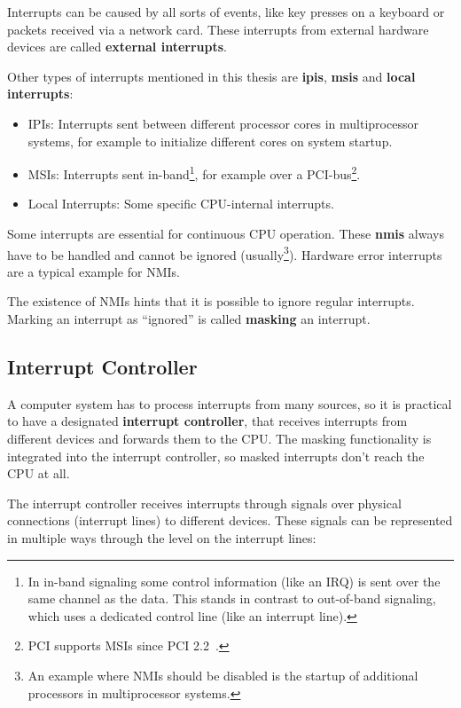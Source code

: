 Interrupts can be caused by all sorts of events, like key presses on a keyboard or packets received
via a network card. These interrupts from external hardware devices are called
\textbf{\glspl{external interrupt}}.

Other types of interrupts mentioned in this thesis are \textbf{\glspl{ipi}}, \textbf{\glspl{msi}}
and \textbf{\glspl{local interrupt}}:

\begin{itemize}
  \item IPIs: Interrupts sent between different processor cores in multiprocessor systems, for example to
        initialize different cores on system startup.
  \item MSIs: Interrupts sent in-band\footnote{In in-band signaling some control information (like an IRQ)
          is sent over the same channel as the data. This stands in contrast to out-of-band signaling, which
          uses a dedicated control line (like an interrupt line).}, for example over a PCI-bus\footnote{PCI
          supports MSIs since PCI 2.2~\cite[sec.~6.8]{pci22}.}.
  \item Local Interrupts: Some specific CPU-internal interrupts.
\end{itemize}

Some interrupts are essential for continuous CPU operation. These \textbf{\glspl{nmi}} always have
to be handled and cannot be ignored (usually\footnote{An example where NMIs should be disabled is
  the startup of additional processors in multiprocessor systems.}). Hardware error interrupts are a
typical example for NMIs.

The existence of NMIs hints that it is possible to ignore regular interrupts. Marking an interrupt
as ``ignored'' is called \textbf{\gls{masking}} an interrupt.

\subsection{Interrupt Controller}
\label{subsec:controller}

A computer system has to process interrupts from many sources, so it is practical to have a
designated \textbf{\gls{interrupt controller}}, that receives interrupts from different devices and
forwards them to the CPU. The masking functionality is integrated into the interrupt controller, so
masked interrupts don't reach the CPU at all.

The interrupt controller receives interrupts through signals over physical connections (interrupt
lines) to different devices. These signals can be represented in multiple ways through the level on
the interrupt lines:


